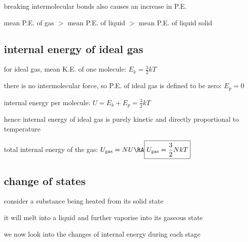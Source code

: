 breaking intermolecular bonds also causes an increase in P.E.

mean P.E. of gas $>$ mean P.E. of liquid $>$ mean P.E. of liquid solid

\subsection{internal energy of ideal gas}

for ideal gas, mean K.E. of one molecule: $E_k = \frac{3}{2}kT$

there is no intermolecular force, so P.E. of ideal gas is defined to be zero: $E_p = 0$

internal energy per molecule: $U = E_k + E_p = \frac{3}{2}kT$

hence internal energy of ideal gas is purely kinetic and directly proportional to temperature

total internal energy of the gas: $U_\text{gas} = NU \RA \boxed{U_\text{gas} = \frac{3}{2}NkT}$

\subsection{change of states}

consider a substance being heated from its solid state

it will melt into a liquid and further vaporise into its gaseous state

we now look into the changes of internal energy during each stage

\begin{figure}[ht]
\centering
{}
\end{figure}


